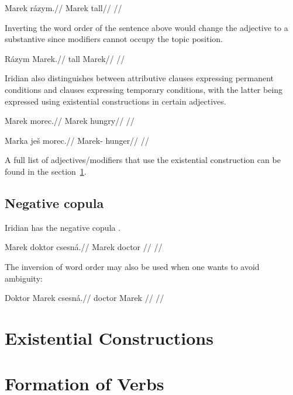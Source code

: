 \pex
\begingl
\gla Marek rázym.//
\glb Marek tall//
\glft {}//
\endgl
\xe

Inverting the word order of the sentence above would change the adjective to a substantive since modifiers cannot occupy the topic position.

\pex
\begingl
\gla Rázym Marek.//
\glb tall Marek//
\glft {}//
\endgl
\xe

Iridian also distinguishes between attributive clauses expressing permanent conditions and clauses expressing temporary conditions, with the latter being expressed using existential constructions in certain adjectives.

\pex
\begingl
\gla *Marek morec.//
\glb Marek hungry//
\glft {}//
\endgl
\xe


\pex
\begingl
\gla Marka je\v{s} morec.//
\glb Marek-  hunger//
\glft {}//
\endgl
\xe

A full list of adjectives/modifiers that use the existential construction can be found in the section~\ref{sec:exst}.

\subsection{Negative copula}

Iridian has the negative copula .

\pex
\begingl
\gla Marek doktor csesná.//
\glb Marek doctor //
\glft {}//
\endgl
\xe

\par The inversion of word order may also be used when one wants to avoid ambiguity:

\pex
\begingl
\gla Doktor Marek csesná.//
\glb doctor Marek //
\glft {}//
\endgl
\xe

\section{Existential Constructions}
\label{sec:exst}

\section{Formation of Verbs}
